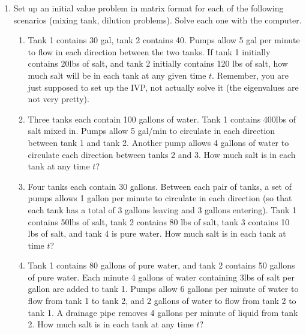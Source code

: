 \begin{multicols}{2}
\begin{enumerate}
\begin{enumerate}
	
\end{enumerate}

\item Set up an initial value problem in matrix format for each of the following scenarios (mixing tank, dilution problems). Solve each one with the computer.
\begin{enumerate}
	\item Tank 1 contains 30 gal, tank 2 contains 40.  Pumps allow 5 gal per minute to flow in each direction between the two tanks.  If tank 1 initially contains 20lbs of salt, and tank 2 initially contains 120 lbs of salt, how much salt will be in each tank at any given time $t$.  Remember, you are just supposed to set up the IVP, not actually solve it (the eigenvalues are not very pretty).
	\item Three tanks each contain 100 gallons of water. Tank 1 contains 400lbs of salt mixed in.  Pumps allow 5 gal/min to circulate in each direction between tank 1 and tank 2.  Another pump allows 4 gallons of water to circulate each direction between tanks 2 and 3.  How much salt is in each tank at any time $t$?
	\item Four tanks each contain 30 gallons. Between each pair of tanks, a set of pumps allows 1 gallon per minute to circulate in each direction (so that each tank has a total of 3 gallons leaving and 3 gallons entering). Tank 1 contains 50lbs of salt, tank 2 contains 80 lbs of salt, tank 3 contains 10 lbs of salt, and tank 4 is pure water. How much salt is in each tank at time $t$?
	\item Tank 1 contains 80 gallons of pure water, and tank 2 contains 50 gallons of pure water.  Each minute 4 gallons of water containing 3lbs of salt per gallon are added to tank 1. Pumps allow 6 gallons per minute of water to flow from tank 1 to tank 2, and 2 gallons of water to flow from tank 2 to tank 1.  A drainage pipe removes 4 gallons per minute of liquid from tank 2. How much salt is in each tank at any time $t$?
\end{enumerate}



\end{enumerate}
\end{multicols}
